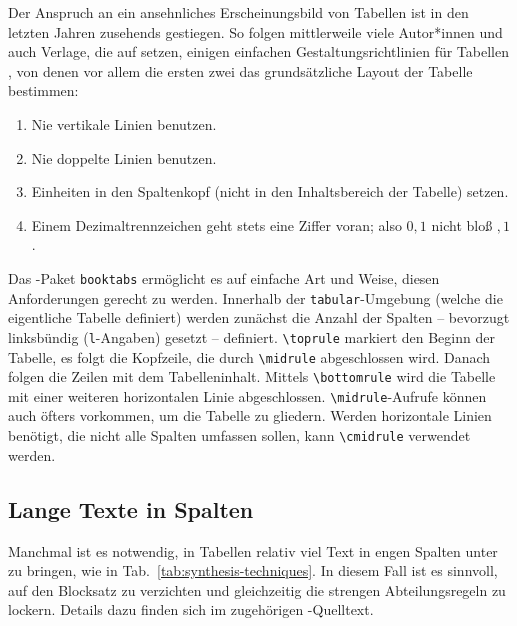 Der Anspruch an ein ansehnliches Erscheinungsbild von Tabellen ist in den letzten
Jahren zusehends gestiegen. So folgen mittlerweile viele Autor*innen und auch Verlage,
die auf \latex setzen, einigen einfachen Gestaltungsrichtlinien für Tabellen \cite{Fear2020}, von denen
vor allem die ersten zwei das grundsätzliche Layout der Tabelle bestimmen:

\begin{enumerate}
	\item Nie vertikale Linien benutzen.
	\item Nie doppelte Linien benutzen.
	\item Einheiten in den Spaltenkopf (nicht in den Inhaltsbereich der Tabelle) setzen.
	\item Einem Dezimaltrennzeichen geht stets eine Ziffer voran; also $0{,}1$ nicht bloß ${,}1$.
\end{enumerate}

Das \latex-Paket \texttt{booktabs} ermöglicht es auf einfache Art und Weise, diesen
Anforderungen gerecht zu werden. Innerhalb der \texttt{tabular}-Umgebung (welche die eigentliche Tabelle definiert)
werden zunächst die Anzahl der Spalten -- bevorzugt linksbündig (\texttt{l}-Angaben) gesetzt -- definiert.
\verb|\toprule| markiert den Beginn der Tabelle, es folgt die Kopfzeile, die durch \verb|\midrule| abgeschlossen wird.
Danach folgen die Zeilen mit dem Tabelleninhalt. Mittels \verb|\bottomrule| wird die Tabelle mit einer weiteren
horizontalen Linie abgeschlossen. \verb|\midrule|-Aufrufe können auch öfters vorkommen, um die Tabelle zu gliedern.
Werden horizontale Linien benötigt, die nicht alle Spalten umfassen sollen, kann \verb|\cmidrule| verwendet werden.

\subsection{Lange Texte in Spalten}

Manchmal ist es notwendig, in Tabellen relativ viel Text in engen Spalten
unter zu bringen, wie in Tab.~\ref{tab:synthesis-techniques}. In diesem Fall
ist es sinnvoll, auf den Blocksatz zu verzichten und gleichzeitig die
strengen Abteilungsregeln zu lockern. Details dazu finden sich im zugehörigen
\latex-Quelltext.


